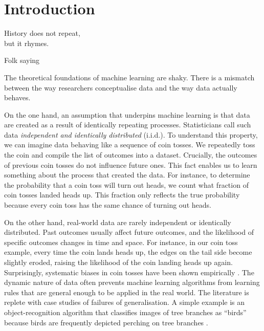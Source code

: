 \documentclass[../thesis.tex]{subfiles}
\begin{document}
\chapter{Introduction}

\epigraph{History does not repeat,\\ but it rhymes.}{Folk saying}

The theoretical foundations of machine learning are shaky. There is a mismatch between the way researchers conceptualise data and the way data actually behaves.

On the one hand, an assumption that underpins machine learning is that data are created as a result of identically repeating processes. Statisticians call such data \textit{independent and identically distributed} (i.i.d.). To understand this property, we can imagine data behaving like a sequence of coin tosses. We repeatedly toss the coin and compile the list of outcomes into a dataset. Crucially, the outcomes of previous coin tosses do not influence future ones. This fact enables us to learn something about the process that created the data. For instance, to determine the probability that a coin toss will turn out heads, we count what fraction of coin tosses landed heads up. This fraction only reflects the true probability because every coin toss has the same chance of turning out heads.


On the other hand, real-world data are rarely independent or identically distributed. Past outcomes usually affect future outcomes, and the likelihood of specific outcomes changes in time and space. For instance, in our coin toss example, every time the coin lands heads up, the edges on the tail side become slightly eroded, raising the likelihood of the coin landing heads up again. Surprisingly, systematic biases in coin tosses have been shown empirically \citep{bartosFairCoinsTend2024}. The dynamic nature of data often prevents machine learning algorithms from learning rules that are general enough to be applied in the real world. The literature is replete with case studies of failures of generalisation. A simple example is an object-recognition algorithm that classifies images of tree branches as ``birds'' because birds are frequently depicted perching on tree branches \citep{wangCausalAttentionUnbiased2021a}.
\end{document}

